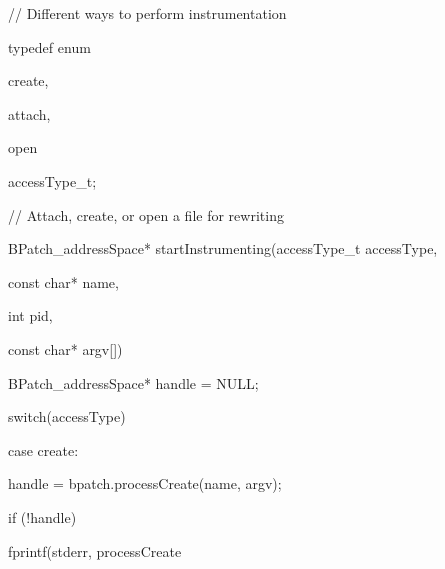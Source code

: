 {

// Different ways to perform instrumentation}



{

typedef enum {}



{

create,}



{

attach,}



{

open}



{

} accessType_t;





\bigskip



{

// Attach, create, or open a file for rewriting}



{

BPatch_addressSpace* startInstrumenting(accessType_t accessType,}



{

const char* name,}



{

int pid,}



{

const char* argv[]) {}



{

BPatch_addressSpace* handle = NULL;}





\bigskip



{

switch(accessType) {}



{

case create:}



{

handle = bpatch.processCreate(name, argv);}



{

if (!handle) { fprintf(stderr, {\textquotedbl}processCreate

}}}}}
